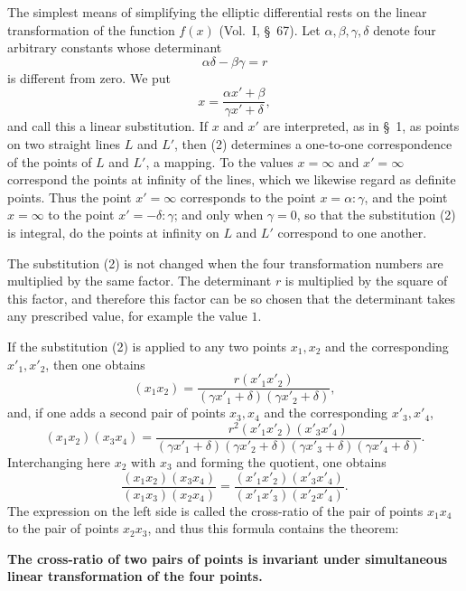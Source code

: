 \documentclass[11pt]{article}
\begin{document}
The simplest means of simplifying the elliptic differential rests on the linear transformation of the function $f(x)$ (Vol.~I, \S~67). Let $\alpha,\beta,\gamma,\delta$ denote four arbitrary constants whose determinant
\begin{equation}
\alpha\delta-\beta\gamma=r
\tag{1}
\end{equation}
is different from zero. We put
\begin{equation}
x=\frac{\alpha x'+\beta}{\gamma x'+\delta},
\tag{2}
\end{equation}
and call this a linear substitution. If $x$ and $x'$ are interpreted, as in \S~1, as points on two straight lines $L$ and $L'$, then (2) determines a one-to-one correspondence of the points of $L$ and $L'$, a mapping. To the values $x=\infty$ and $x'=\infty$ correspond the points at infinity of the lines, which we likewise regard as definite points. Thus the point $x'=\infty$ corresponds to the point $x=\alpha:\gamma$, and the point $x=\infty$ to the point $x'=-\delta:\gamma$; and only when $\gamma=0$, so that the substitution (2) is integral, do the points at infinity on $L$ and $L'$ correspond to one another.

The substitution (2) is not changed when the four transformation numbers are multiplied by the same factor. The determinant $r$ is multiplied by the square of this factor, and therefore this factor can be so chosen that the determinant takes any prescribed value, for example the value $1$.

If the substitution (2) is applied to any two points $x_1,x_2$ and the corresponding $x'_1,x'_2$, then one obtains
\[
(x_1x_2)=\frac{r(x'_1x'_2)}{(\gamma x'_1+\delta)(\gamma x'_2+\delta)},
\]
and, if one adds a second pair of points $x_3,x_4$ and the corresponding $x'_3,x'_4$,
\[
(x_1x_2)(x_3x_4)=\frac{r^2(x'_1x'_2)(x'_3x'_4)}{(\gamma x'_1+\delta)(\gamma x'_2+\delta)(\gamma x'_3+\delta)(\gamma x'_4+\delta)}.
\]
Interchanging here $x_2$ with $x_3$ and forming the quotient, one obtains
\begin{equation}
\frac{(x_1x_2)(x_3x_4)}{(x_1x_3)(x_2x_4)}=\frac{(x'_1x'_2)(x'_3x'_4)}{(x'_1x'_3)(x'_2x'_4)}.
\tag{3}
\end{equation}
The expression on the left side is called the cross-ratio of the pair of points $x_1x_4$ to the pair of points $x_2x_3$, and thus this formula contains the theorem:

\begin{center}
\textbf{The cross-ratio of two pairs of points is invariant under simultaneous linear transformation of the four points.}
\end{center}
\end{document}
